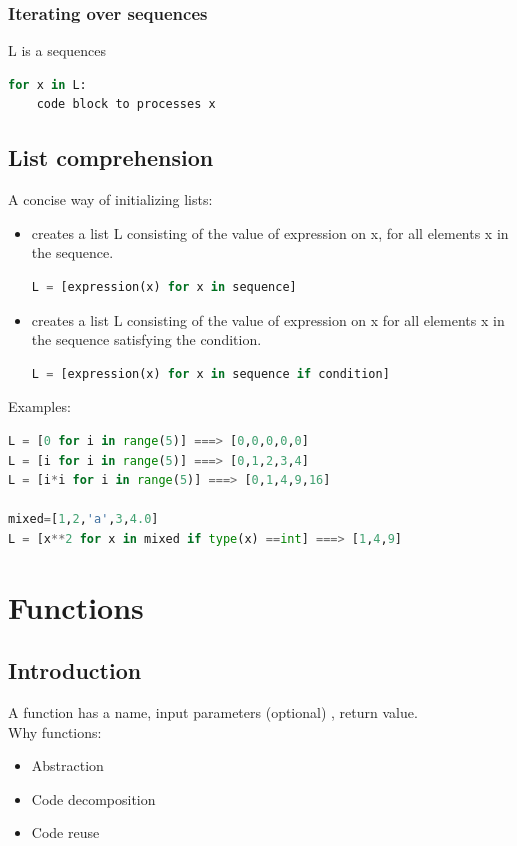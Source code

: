 \documentclass[12pt,oneside]{book}
\begin{document}
\subsection{Iterating over sequences}
L is a sequences
\begin{lstlisting}[language=python]
for x in L:
	code block to processes x 
    \end{lstlisting}
\section{List comprehension}
A concise way of initializing lists:
\begin{itemize}
	\item creates a list L consisting of the value of expression on x, for all elements x in the sequence.
\begin{lstlisting}[language=python]
L = [expression(x) for x in sequence]
\end{lstlisting}
	\item creates a list L consisting of the value of expression on x for all elements x in the sequence satisfying the condition.
\begin{lstlisting}[language=python]
L = [expression(x) for x in sequence if condition]
\end{lstlisting}
\end{itemize}
Examples:
\begin{lstlisting}[language=python]
L = [0 for i in range(5)] ===> [0,0,0,0,0]
L = [i for i in range(5)] ===> [0,1,2,3,4]
L = [i*i for i in range(5)] ===> [0,1,4,9,16]

mixed=[1,2,'a',3,4.0]
L = [x**2 for x in mixed if type(x) ==int] ===> [1,4,9]
\end{lstlisting}
\pagebreak
\chapter{Functions}
\section{Introduction}
A function has a name, input parameters (optional) , return value.\\
Why functions:
\begin{itemize}
	\item Abstraction
	\item Code decomposition
	\item Code reuse
\end{itemize}
\end{document}
